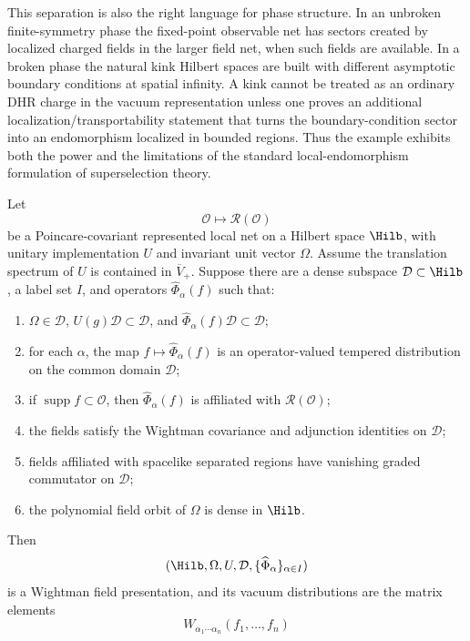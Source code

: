 This separation is also the right language for phase structure.  In an
unbroken finite-symmetry phase the fixed-point observable net has sectors
created by localized charged fields in the larger field net, when such fields
are available.  In a broken phase the natural kink Hilbert spaces are built
with different asymptotic boundary conditions at spatial infinity.  A kink
cannot be treated as an ordinary DHR charge in the vacuum representation
unless one proves an additional localization/transportability statement that
turns the boundary-condition sector into an endomorphism localized in bounded
regions.  Thus the example exhibits both the power and the limitations of the
standard local-endomorphism formulation of superselection theory.

\begin{remark}
\label{rem:aqft-to-wightman-fields}
Let
\[
  \mathcal O\longmapsto\mathcal R(\mathcal O)
\]
be a Poincare-covariant represented local net on a Hilbert space \(\Hilb\),
with unitary implementation \(U\) and invariant unit vector \(\Omega\).  Assume
the translation spectrum of \(U\) is contained in \(\overline V_+\).  Suppose
there are a dense subspace \(\mathcal D\subset\Hilb\), a label set \(I\), and
operators \(\widehat\Phi_\alpha(f)\) such that:
\begin{enumerate}[label=\textup{(\roman*)}]
\item \(\Omega\in\mathcal D\), \(U(g)\mathcal D\subset\mathcal D\), and
\(\widehat\Phi_\alpha(f)\mathcal D\subset\mathcal D\);
\item for each \(\alpha\), the map
\(f\mapsto\widehat\Phi_\alpha(f)\) is an operator-valued tempered
distribution on the common domain \(\mathcal D\);
\item if \(\operatorname{supp}f\subset\mathcal O\), then
\(\widehat\Phi_\alpha(f)\) is affiliated with \(\mathcal R(\mathcal O)\);
\item the fields satisfy the Wightman covariance and adjunction identities on
\(\mathcal D\);
\item fields affiliated with spacelike separated regions have vanishing graded
commutator on \(\mathcal D\);
\item the polynomial field orbit of \(\Omega\) is dense in \(\Hilb\).
\end{enumerate}
Then
\[
  (\Hilb,\Omega,U,\mathcal D,\{\widehat\Phi_\alpha\}_{\alpha\in I})
\]
is a Wightman field presentation, and its vacuum distributions are the matrix
elements
\[
  W_{\alpha_1\cdots\alpha_n}(f_1,\ldots,f_n)
\]
\end{remark}
